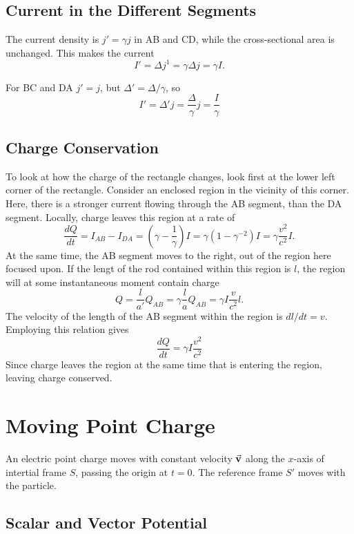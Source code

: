 \documentclass[11pt]{amsart}
\begin{document}
\subsection{Current in the Different Segments}
The current density is $j' = \gamma j$ in AB and CD, while the cross-sectional area is unchanged. This makes the current
\begin{equation}
I' = \Delta j^1 = \gamma\Delta j = \gamma I.
\end{equation}

For BC and DA $j' = j$, but $\Delta' = \Delta / \gamma$, so
\begin{equation}
I' = \Delta'j = \frac{\Delta}{\gamma}j = \frac{I}{\gamma}
\end{equation}

\subsection{Charge Conservation}
To look at how the charge of the rectangle changes, look first at the lower left corner of the rectangle. Consider an enclosed region in the vicinity of this corner. Here, there is a stronger current flowing through the AB segment, than the DA segment. Locally, charge leaves this region at a rate of
\begin{equation}
\frac{dQ}{dt} = I_{AB} - I_{DA} = \left(\gamma - \frac{1}{\gamma}\right)I = \gamma(1-\gamma^{-2})I = \gamma\frac{v^2}{c^2}I.
\end{equation}
At the same time, the AB segment moves to the right, out of the region here focused upon. If the lengt of the rod contained within this region is $l$, the region will at some instantaneous moment contain charge
\begin{equation}
Q = \frac{l}{a'}Q_{AB} = \gamma\frac{l}{a}Q_{AB} = \gamma I \frac{v}{c^2}l.
\end{equation}
The velocity of the length of the AB segment within the region is $dl/dt = v$. Employing this relation gives
\begin{equation}
\frac{dQ}{dt} = \gamma I \frac{v^2}{c^2}
\end{equation}
Since charge leaves the region at the same time that is entering the region, leaving charge conserved.

\section{Moving Point Charge}
An electric point charge moves with constant velocity $\va{v}$ along the $x$-axis of intertial frame $S$, passing the origin at $t=0$. The reference frame $S'$ moves with the particle.

\subsection{Scalar and Vector Potential}
\end{document}
